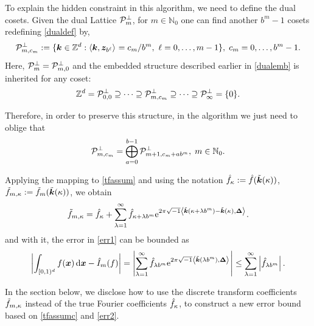 \documentclass[graybox,footinfo]{svmult}
\newcommand{\Z}{\mathbb{Z}} %
\newcommand{\N}{\mathbb{N}} %
\newcommand{\bsx}{\boldsymbol{x}}    %
\newcommand{\bsz}{\boldsymbol{z}}    %
\newcommand{\bsDelta}{\boldsymbol{\Delta}}    %
\begin{document}
To explain the hidden constraint in this algorithm, we need to define the dual cosets. Given the dual Lattice $\mathcal{P}_{m}^{\perp}$, for $m\in\N_0$ one can find another $b^m-1$ cosets redefining \eqref{dualdef} by,
\begin{align}
\cp_{m,c_m}^\perp:=\{\bsk \in \Z^d : \ip{\bsk}{\bsz_{b^{\ell}}} = c_m/b^m, \ \ell=0, \ldots, m-1\}, \; c_m=0, \ldots, b^m-1.\label{dualdefcoset}
\end{align}
Here, $\mathcal{P}_{m}^{\perp}=\mathcal{P}_{m,0}^\perp$ and the embedded structure described earlier in \eqref{dualemb} is inherited for any coset:
\begin{equation}\label{dualemb}
\Z^d=\cp^{\perp}_{0,0}\supseteq\dots\supseteq\cp^{\perp}_{m,c_m}\supseteq\dots\supseteq\cp^{\perp}_{\infty}=\{0\}.
\end{equation}

Therefore, in order to preserve this structure, in the algorithm we just need to oblige that
\begin{equation}
\cp^{\perp}_{m,c_m}=\bigoplus_{a=0}^{b-1}\cp^{\perp}_{m+1,c_m+ab^m}, \; m\in\N_0.
\end{equation}

Applying the mapping to \eqref{tfassum} and using the notation $\hat{f}_{\kappa} :=\hat{f}(\tilde{\boldsymbol{k}}(\kappa))$, $\tilde{f}_{m,\kappa} := \tilde{f}_m(\tilde{\boldsymbol{k}}(\kappa))$, we obtain
\begin{equation}
\tf_{m,\kappa} = \hf_{\kappa} + \sum_{\lambda=1}^{\infty} \hf_{\kappa+\lambda b^{m}} \me^{2 \pi \sqrt{-1} \ip{\tvk(\kappa+\lambda b^{m}) - \tvk(\kappa)}{\bsDelta}}.
\label{tfassumc}
\end{equation}
and with it, the error in \eqref{err1} can be bounded as
\begin{equation}
\biggabs{ \int_{\cube} f(\bsx) \, \D \bsx - \hI_m(f)} 
= \Biggabs {\sum_{\lambda=1}^{\infty} \hf_{\lambda b^m} \E^{2 \pi \sqrt{-1} \ip{\tvk(\lambda b^m)}{\bsDelta}}}
\le \sum_{\lambda=1}^{\infty} \left \lvert \hf_{\lambda b^m}\right \rvert. \label{err2}
\end{equation}

In the section below, we disclose how to use the discrete transform coefficients $\tilde{f}_{m,\kappa}$ instead of the true Fourier coefficients $\hat{f}_{\kappa}$, to construct a new error bound based on \eqref{tfassumc} and \eqref{err2}.
\end{document}
